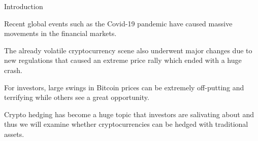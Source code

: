 \begin{frame}{Introduction}
     \begin{block}{}
    Recent global events such as the Covid-19 pandemic have caused massive movements in the financial markets.
    \end{block}

     \begin{block}{}
    The already volatile cryptocurrency scene also underwent major changes due to new regulations that caused an extreme price rally which ended with a huge crash.
    \end{block}
    
  \begin{block}{}
    For investors, large swings in Bitcoin prices can be extremely off-putting and terrifying while others see a
great opportunity. 
    \end{block}
    
     \begin{block}{}
    Crypto hedging has become a huge topic that investors are salivating about and thus we will examine whether cryptocurrencies can be hedged with traditional assets.
    \end{block}
\end{frame}